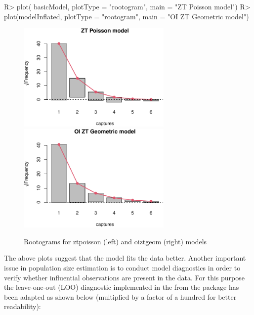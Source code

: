 \documentclass[
]{jss}
\newcommand{\1}{\mathcal{I}} \newcommand{\bZero}{\boldsymbol{0}}
\begin{document}
\begin{CodeChunk}
\begin{CodeInput}
R> plot(   basicModel, plotType = "rootogram", main = "ZT Poisson model")
R> plot(modelInflated, plotType = "rootogram", main = "OI ZT Geometric model")
\end{CodeInput}
\begin{figure}[ht]

{\centering \includegraphics[width=7.5cm]{singleRcapture_files/figure-latex/rootogram-1} \includegraphics[width=7.5cm]{singleRcapture_files/figure-latex/rootogram-2} 

}

\caption[Rootograms for ztpoisson (left) and oiztgeom (right) models]{Rootograms for ztpoisson (left) and oiztgeom (right) models}\label{fig:rootogram}
\end{figure}
\end{CodeChunk}

The above plots suggest that the  model fits the data
better. Another important issue in population size estimation is to
conduct model diagnostics in order to verify whether influential
observations are present in the data. For this purpose the leave-one-out
(LOO) diagnostic implemented in the  from the 
package has been adapted as shown below (multiplied by a factor of a
hundred for better readability):
\end{document}
